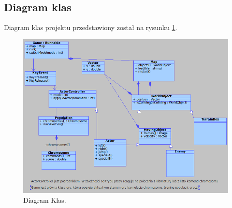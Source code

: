 \subsection{Diagram klas}
\begin{par}
	\begin{par}
	Diagram klas projektu przedstawiony został na rysunku \ref{fig:diagram_klas}.
	\end{par}
	\begin{figure}[!h]
	\centering
	\includegraphics[width=\textwidth]{obrazki/diagram_klas.png}
	\caption{Diagram Klas.}
	\label{fig:diagram_klas}
	\end{figure}
\end{par}


